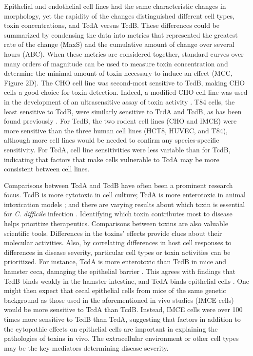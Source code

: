 Epithelial and endothelial cell lines had the same 
characteristic changes in morphology, yet the rapidity 
of the changes distinguished different cell types, 
toxin concentrations, and TcdA versus TcdB. These differences 
could be summarized by condensing the data into metrics 
that represented the greatest rate of the change (MaxS) 
and the cumulative amount of change over several hours 
(ABC). When these metrics are considered together, standard 
curves over many orders of magnitude can be used to 
measure toxin concentration and determine the minimal 
amount of toxin necessary to induce an effect (MCC, Figure 2D). 
The CHO cell line was second-most sensitive to TcdB, making 
CHO cells a good choice for toxin detection. Indeed, a 
modified CHO cell line was used in the development of an 
ultrasensitive assay of toxin activity \cite{He:2009hg}. T84 cells, 
the least sensitive to TcdB, were similarly sensitive to 
TcdA and TcdB, as has been found previously \cite{ChavesOlarte:1997cs}. For 
TcdB, the two rodent cell lines (CHO and IMCE) were more 
sensitive than the three human cell lines (HCT8, HUVEC, 
and T84), although more cell lines would be needed to 
confirm any species-specific sensitivity. For TcdA, 
cell line sensitivities were less variable than for TcdB, 
indicating that factors that make cells vulnerable to 
TcdA may be more consistent between cell lines.

Comparisons between TcdA and TcdB have often been a 
prominent research focus. TcdB is more cytotoxic in cell 
culture; TcdA is more enterotoxic in animal intoxication 
models \cite{DAuria:2013jo,Lyerly:1985dx}; and there are varying results about which 
toxin is essential for \textit{C. difficile} infection \cite{Kuehne:2010hv,Lyras:2009jx}. 
Identifying which toxin contributes most to disease helps 
prioritize therapeutics. Comparisons between toxins are 
also valuable scientific tools. Differences in the toxins' 
effects provide clues about their molecular activities. 
Also, by correlating differences in host cell responses 
to differences in disease severity, particular cell 
types or toxin activities can be prioritized. For instance, 
TcdA is more enterotoxic than TcdB in mice and hamster 
ceca, damaging the epithelial barrier \cite{DAuria:2013jo,Libby:1982wm}. This 
agrees with findings that TcdB binds weakly in the hamster 
intestine, and TcdA binds epithelial cells \cite{Rolfe:1991vx,Keel:2007jh}. 
One might then expect that cecal epithelial cells from 
mice of the same genetic background as those used in the 
aforementioned in vivo studies (IMCE cells) would be 
more sensitive to TcdA than TcdB. Instead, IMCE cells 
were over 100 times more sensitive to TcdB than TcdA, 
suggesting that factors in addition to the cytopathic 
effects on epithelial cells are important in explaining 
the pathologies of toxins in vivo. The extracellular 
environment or other cell types may be the key mediators 
determining disease severity.

